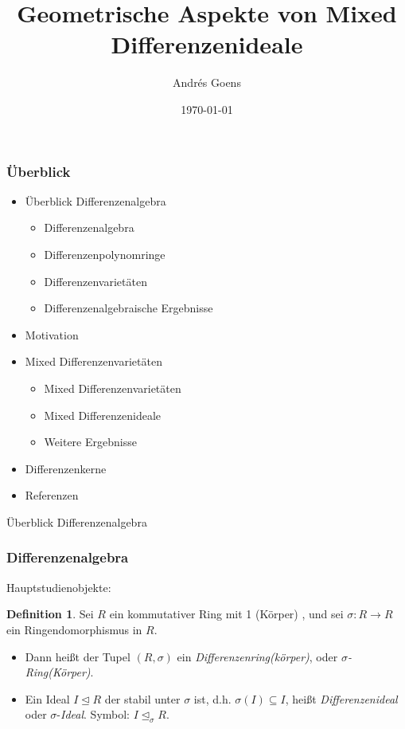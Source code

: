 \documentclass{beamer}
\title{Geometrische Aspekte von Mixed Differenzenideale}
\author{Andr\'{e}s Goens}
\date{\today}
\def\s{\sigma}
\def\si{\unlhd_{\sigma}}
\theoremstyle{definition}
\newtheorem{defn}[satz]{Definition}
\begin{document}
\begin{frame}
\maketitle
\end{frame}

\begin{frame}\frametitle{Überblick}
\begin{itemize}
\item Überblick Differenzenalgebra
\begin{itemize}
\item Differenzenalgebra
\item Differenzenpolynomringe
\item Differenzenvarietäten
\item Differenzenalgebraische Ergebnisse
\end{itemize}
\item Motivation 
\item Mixed Differenzenvarietäten
\begin{itemize}
\item Mixed Differenzenvarietäten
\item Mixed Differenzenideale
\item Weitere Ergebnisse
\end{itemize}
\item Differenzenkerne
\item Referenzen
\end{itemize}
\end{frame}

\begin{frame}
\begin{center}
\LARGE Überblick Differenzenalgebra
\end{center}
\end{frame}

\begin{frame}\frametitle{Differenzenalgebra}
Hauptstudienobjekte:
\begin{defn}
Sei  $R$ ein kommutativer Ring mit 1 (K\"{o}rper) , und sei
 $\sigma: R \rightarrow R$ ein Ringendomorphismus in $R$.
\begin{itemize}
\item Dann heißt der Tupel $(R,\sigma)$ ein \emph{Differenzenring(k\"{o}rper)}, oder $\sigma$\emph{-Ring(K\"{o}rper)}.
\item Ein Ideal $I \unlhd R$ der stabil unter $\s$ ist, d.h. $\s(I) \subseteq I$, heißt \emph{Differenzenideal} oder $\s$-\emph{Ideal}. Symbol: $I \si R$.
\end{itemize}
\end{defn}
\end{frame}
\end{document}
